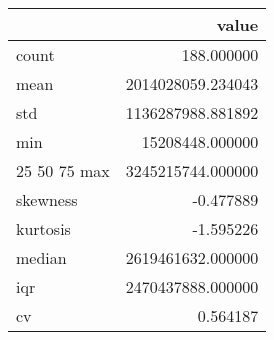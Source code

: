 \begin{tabular}{lr}
\toprule
 & value \\
\midrule
count & 188.000000 \\
mean & 2014028059.234043 \\
std & 1136287988.881892 \\
min & 15208448.000000 \\
25%
50%
75%
max & 3245215744.000000 \\
skewness & -0.477889 \\
kurtosis & -1.595226 \\
median & 2619461632.000000 \\
iqr & 2470437888.000000 \\
cv & 0.564187 \\
\bottomrule
\end{tabular}
